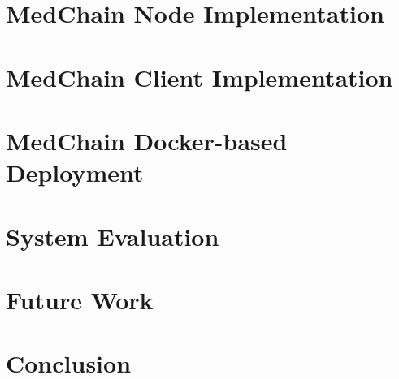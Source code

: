 \documentclass[12pt]{article}
\begin{document}
\section{MedChain Node Implementation}\label{section4}


\section{MedChain Client Implementation}\label{section5}


\section{MedChain Docker-based Deployment}\label{section6}


\section{System Evaluation}\label{section7}



\section{Future Work}\label{section8}


\section{Conclusion}\label{section9}






%


\pagebreak

\end{document}
